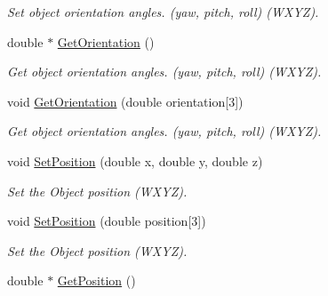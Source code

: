 \begin{DoxyCompactItemize}
\begin{DoxyCompactList}\small\item\em Set object orientation angles. (yaw, pitch, roll) (WXYZ). \item\end{DoxyCompactList}\item 
\hypertarget{classvtkScenarioItem_a39dcbfadb0def37468ebcb1869693789}{
double $\ast$ \hyperlink{classvtkScenarioItem_a39dcbfadb0def37468ebcb1869693789}{GetOrientation} ()}
\label{classvtkScenarioItem_a39dcbfadb0def37468ebcb1869693789}

\begin{DoxyCompactList}\small\item\em Get object orientation angles. (yaw, pitch, roll) (WXYZ). \item\end{DoxyCompactList}\item 
\hypertarget{classvtkScenarioItem_a210ed163f21df3f344ba2d13c6d50fcf}{
void \hyperlink{classvtkScenarioItem_a210ed163f21df3f344ba2d13c6d50fcf}{GetOrientation} (double orientation\mbox{[}3\mbox{]})}
\label{classvtkScenarioItem_a210ed163f21df3f344ba2d13c6d50fcf}

\begin{DoxyCompactList}\small\item\em Get object orientation angles. (yaw, pitch, roll) (WXYZ). \item\end{DoxyCompactList}\item 
\hypertarget{classvtkScenarioItem_a004fe7d03bfb56a842a52aafbeb8506b}{
void \hyperlink{classvtkScenarioItem_a004fe7d03bfb56a842a52aafbeb8506b}{SetPosition} (double x, double y, double z)}
\label{classvtkScenarioItem_a004fe7d03bfb56a842a52aafbeb8506b}

\begin{DoxyCompactList}\small\item\em Set the Object position (WXYZ). \item\end{DoxyCompactList}\item 
\hypertarget{classvtkScenarioItem_ad9289040db530909a73784e759204593}{
void \hyperlink{classvtkScenarioItem_ad9289040db530909a73784e759204593}{SetPosition} (double position\mbox{[}3\mbox{]})}
\label{classvtkScenarioItem_ad9289040db530909a73784e759204593}

\begin{DoxyCompactList}\small\item\em Set the Object position (WXYZ). \item\end{DoxyCompactList}\item 
\hypertarget{classvtkScenarioItem_a335a82a650c20a23042780a1bc21d6c8}{
double $\ast$ \hyperlink{classvtkScenarioItem_a335a82a650c20a23042780a1bc21d6c8}{GetPosition} ()}
\label{classvtkScenarioItem_a335a82a650c20a23042780a1bc21d6c8}


\end{DoxyCompactItemize}

